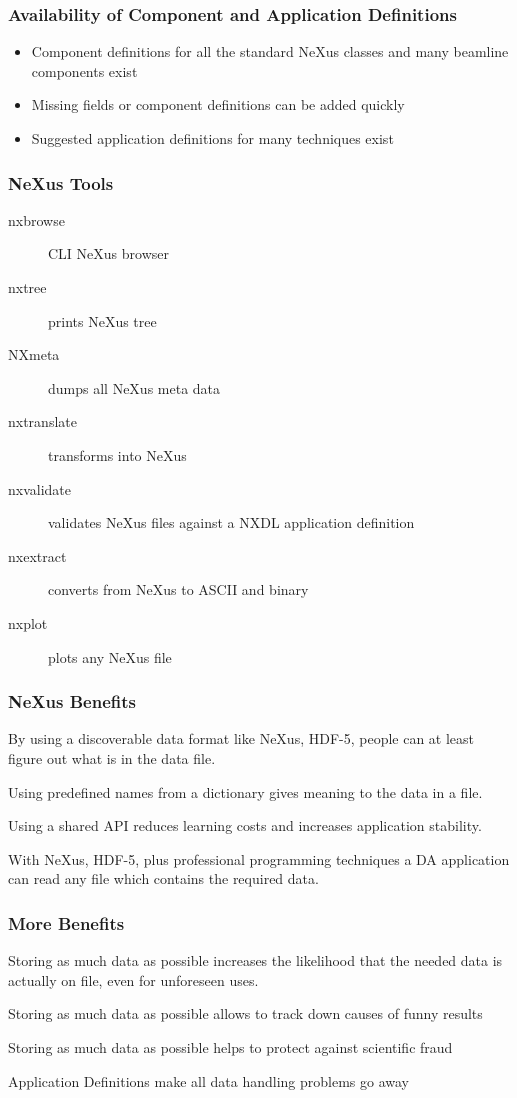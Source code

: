 \documentclass{beamer}
\begin{document}
\begin{frame} \frametitle{Availability of Component and Application Definitions}
\begin{itemize}
\item Component definitions for all the standard NeXus classes and many beamline 
 components exist
\item Missing fields or component definitions can be added quickly
\item Suggested application definitions for many techniques exist
\end{itemize}
\end{frame}


\begin{frame} \frametitle{NeXus Tools}
\begin{description}
\item[nxbrowse] CLI NeXus browser
\item[nxtree] prints NeXus tree
\item[NXmeta] dumps all NeXus meta data
\item[nxtranslate] transforms into NeXus 
\item[nxvalidate] validates NeXus files against a NXDL application definition 
\item[nxextract] converts from NeXus to ASCII and binary
\item[nxplot] plots any NeXus file
\end{description}
\end{frame}


\begin{frame} \frametitle{NeXus Benefits}
\begin{description}
\item<1->[Benefit 1] By using a discoverable data format like NeXus, HDF-5, people can at 
 least figure out  what is in the data file. 
\item<2->[Benefit 2] Using predefined names from a dictionary gives meaning to the data in a file.
\item<3->[Benefit 3] Using a shared API reduces learning costs and increases application stability.
\item<4->[Benefit 4] With NeXus, HDF-5, plus professional programming techniques a DA application can 
 read any file which contains the required data.
\end{description}
\end{frame}


\begin{frame} \frametitle{More Benefits}
\begin{description}
\item<1->[Benefit 5] Storing as much data as possible increases the likelihood that the needed 
 data is actually on file, even for unforeseen uses. 
\item<2->[Benefit 6] Storing as much data as possible allows to track down causes of funny results 
\item<3->[Benefit 7] Storing as much data as possible helps to protect against scientific fraud
\item<4->[Benefit 8] Application Definitions make all data handling problems go away
\end{description}
\end{frame}
\end{document}

